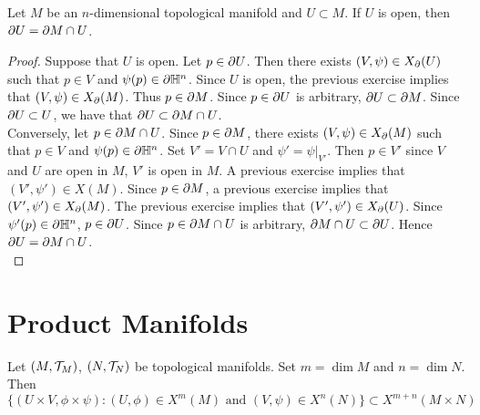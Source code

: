 \documentclass{book}
\begin{document}
	\begin{ex}
		Let $M$ be an $n$-dimensional topological manifold and $U \subset M$. If $U$ is open, then $\partial U = \partial M \cap U$.
	\end{ex}

	\begin{proof}
		Suppose that $U$ is open. Let $p \in \partial U$. Then there exists $(V, \psi) \in X_{\partial}(U)$ such that $p \in V$ and $\psi(p) \in \partial \mathbb{H}^n$. Since $U$ is open, the previous exercise implies that $(V, \psi) \in X_{\partial}(M)$. Thus $p \in \partial M$. Since $p \in \partial U$ is arbitrary, $\partial U \subset \partial M$. Since $\partial U \subset U$, we have that $\partial U \subset \partial M \cap U$.\\
		Conversely, let $p \in \partial M \cap U$. Since $p \in \partial M$, there exists $(V, \psi) \in X_{\partial}(M)$ such that $p \in V$ and $\psi(p) \in \partial \mathbb{H}^n$. Set $V' = V \cap U$ and $\psi' = \psi|_{V'}$. Then $p \in V'$ since $V$ and $U$ are open in $M$, $V'$ is open in $M$. A previous exercise implies that $(V', \psi') \in X(M)$. Since $p \in \partial M$, a previous exercise implies that $(V', \psi') \in X_{\partial}(M)$. The previous exercise implies that $(V', \psi') \in X_{\partial}(U)$. Since $\psi'(p) \in \partial \mathbb{H}^n$, $p \in \partial U$. Since $p \in \partial M \cap U$ is arbitrary, $\partial M \cap U \subset \partial U$. Hence  $\partial U = \partial M \cap U$. \\
	\end{proof}



























\section{Product Manifolds}

\begin{ex}
	Let $(M, \mathcal{T}_M)$, $(N, \mathcal{T}_N)$ be topological manifolds. Set $m = \dim M$ and $n = \dim N$. Then 
	$$\{(U \times V, \phi \times \psi): (U, \phi) \in X^m(M) \text{ and } (V, \psi) \in X^n(N)\} \subset X^{m+n}(M \times N)$$
\end{ex}
\end{document}
